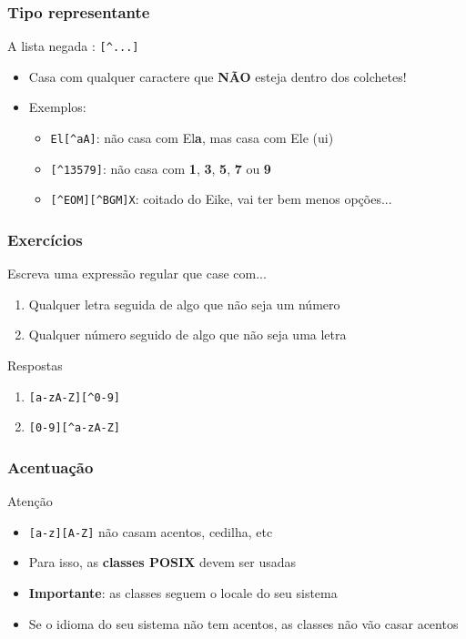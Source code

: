 \documentclass{beamer}
\begin{document}
\begin{frame}
 \frametitle{Tipo representante}
 \begin{block}{A lista negada : \texttt{[\^{}...]}}
  \begin{itemize}
   \item Casa com qualquer caractere que \textbf{NÃO} esteja dentro dos colchetes!
	\pause
   \item Exemplos:
	\begin{itemize}
	 \item \texttt{El[\^{}aA]}: não casa com El\textbf{a}, mas casa com Ele (ui)
	  \pause
	 \item \texttt{[\^{}13579]}: não casa com \textbf{1}, \textbf{3}, \textbf{5}, \textbf{7} ou \textbf{9}
	  \pause
	 \item \texttt{[\^{}EOM][\^{}BGM]X}: coitado do Eike, vai ter bem menos opções...
	\end{itemize}
  \end{itemize}
 \end{block}
\end{frame}

\begin{frame}[fragile]
 \frametitle{Exercícios}
 \begin{block}{Escreva uma expressão regular que case com...}
  \begin{enumerate}
   \item Qualquer letra seguida de algo que não seja um número
   \item Qualquer número seguido de algo que não seja uma letra 
  \end{enumerate}
 \end{block}

 \pause
 \begin{block}{Respostas}
  \begin{enumerate}
   \item \verb=[a-zA-Z][^0-9]=
	\pause
   \item \verb=[0-9][^a-zA-Z]=
  \end{enumerate}
 \end{block}
\end{frame}

\begin{frame}
 \frametitle{Acentuação}
 \begin{block}{Atenção}
  \begin{itemize}
   \item \texttt{[a-z][A-Z]} não casam acentos, cedilha, etc
   \item Para isso, as \textbf{classes POSIX} devem ser usadas
   \item \textbf{Importante}: as classes seguem o locale do seu sistema
   \item Se o idioma do seu sistema não tem acentos, as classes não vão casar acentos
  \end{itemize}
 \end{block}
\end{frame}
\end{document}
